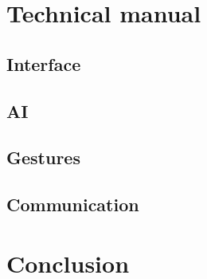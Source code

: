 \documentclass[12pt, a4paper, oneside]{report}
\begin{document}
	\chapter{Technical manual}

	\section{Interface}

	\section{AI}\label{AI_section}

	\section{Gestures}

	\section{Communication}

	\chapter{Conclusion}
\end{document}

